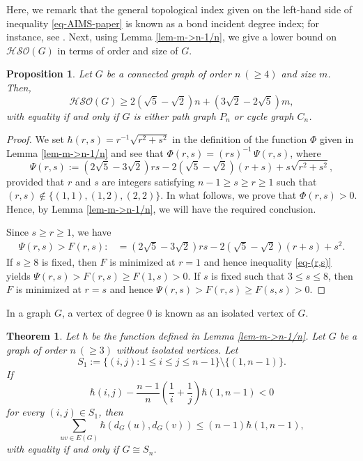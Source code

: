 \documentclass[12pt,a4paper]{article}
\newtheorem{proposition}{Proposition}[section]
\newtheorem{theorem}{Theorem}[section]
\begin{document}
Here, we remark that the general topological index given on the left-hand side of inequality \eqref{eq-AIMS-paper} is known as a bond incident degree index; for instance, see \cite{Ali-CJC-16}.
Next, using Lemma \ref{lem-m->n-1/n}, we give a lower bound on $\mathcal{HSO}(G)$ in terms of order and size of $G$.

\begin{proposition}\label{prop-path-cycle-minimal}
Let $G$ be a connected graph of order $n\ (\ge4)$ and size $m$. Then,
\begin{equation*}
\mathcal{HSO}(G) \ge 2\left(\sqrt{5}-\sqrt{2}\right)n + \left(3\sqrt{2}-2\sqrt{5}\right)m,
\end{equation*}
with equality if and only if $G$ is either path graph $P_n$ or cycle graph $C_n$.
\end{proposition}

\begin{proof}
We set $\hbar(r,s)=r^{-1}\sqrt{r^2+s^2}$ in the definition of the function $\Phi$ given in Lemma \ref{lem-m->n-1/n} and see that $\Phi(r,s)=(rs)^{-1}\,\Psi(r,s)$, where
\[
\Psi(r,s):=\left(2\sqrt{5}-3\sqrt{2}\right)rs-2\left(\sqrt{5}-\sqrt{2}\right)(r+s)+s\sqrt{r^2+s^2},
\]
provided that $r$ and $s$ are integers satisfying $n-1\ge s\ge r\ge 1$ such that \linebreak $(r,s)\not\in\{(1,1),(1,2),(2,2)\}$.
In what follows, we prove that $\Phi(r,s)>0$. Hence, by Lemma \ref{lem-m->n-1/n}, we will have the required conclusion.

Since $s \ge r \ge 1$, we have
\begin{align}\label{eq-(r,s)}
\Psi(r,s)> F(r,s):&= \left(2\sqrt{5}-3\sqrt{2}\right)rs-2\left(\sqrt{5}-\sqrt{2}\right)(r+s)+s^2.
\end{align}
If $s \ge 8$ is fixed, then $F$ is minimized at $r=1$ and hence inequality \eqref{eq-(r,s)} yields $\Psi(r,s)>F(r,s)\ge F(1,s)>0$.
If $s$ is fixed such that $3\le s \le 8$, then $F$ is minimized at $r=s$ and hence  $\Psi(r,s)>F(r,s)\ge F(s,s)>0$.
\end{proof}

In a graph $G$, a vertex of degree $0$ is known as an isolated vertex of $G$.

\begin{theorem}{\rm \cite{Deng-JCO-15}}\label{Deng-JCO-15-lem}
Let $\hbar$ be the function defined in Lemma \ref{lem-m->n-1/n}. Let $G$ be a graph of order $n\ (\ge3)$ without isolated vertices.
Let
\begin{equation}\label{Deng-1}
S_1:=\{(i, j) : 1 \leq i \leq j \leq n-1\}\setminus\{(1, n-1)\}.
\end{equation}
If
\begin{equation}\label{Deng-2}
 \hbar(i,j)-\frac{n-1}{n}\left(\frac{1}{i}+\frac{1}{j}\right) \hbar(1, n-1)<0
\end{equation}
for every $(i, j) \in S_1$,
then
$$\sum_{uv\in E(G)} \hbar(d_G(u),d_G(v)) \leq(n-1) \hbar(1, n-1),$$ with equality if and only if $G\cong S_n$.

\end{theorem}
\end{document}
